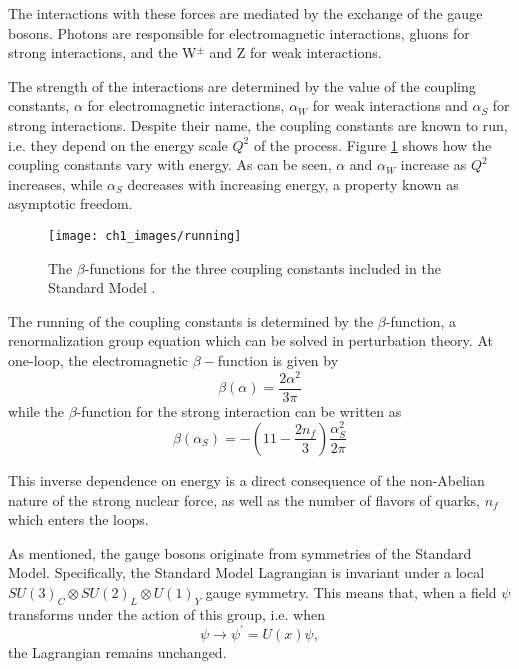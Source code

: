 \documentclass[10pt,a4paper]{book}
\begin{document}
The interactions with these forces are mediated by the exchange of the gauge bosons. Photons are responsible for electromagnetic interactions, gluons for strong interactions, and the W$^\pm$ and Z for weak interactions. 

The strength of the interactions are determined by the value of the coupling constants, $\alpha$ for electromagnetic interactions, $\alpha_W$ for weak interactions and $\alpha_S$ for strong interactions. Despite their name, the coupling constants are known to run, i.e. they depend on the energy scale $Q^2$ of the process. Figure \ref{running coupling constants} shows how the coupling constants vary with energy. As can be seen, $\alpha$ and $\alpha_W$ increase as $Q^2$ increases, while $\alpha_S$ decreases with increasing energy, a property known as asymptotic freedom. 

\begin{figure}
\centering
\texttt{[image: ch1\_images/running]}
\caption{The $\beta$-functions for the three coupling constants included in the Standard Model \cite{wiki:xxx}.}
\label{running coupling constants}
\end{figure}

The running of the coupling constants is determined by the $\beta$-function, a renormalization group equation which can be solved in perturbation theory. At one-loop, the electromagnetic $\beta-$function is given by
\begin{equation}
\beta(\alpha) = \frac{2\alpha^2}{3\pi}
\end{equation}
while the $\beta$-function for the strong interaction can be written as
\begin{equation}
\beta(\alpha_S) = -\left(11 - \frac{2n_f}{3} \right)\frac{\alpha_S^2}{2\pi}
\end{equation}

This inverse dependence on energy is a direct consequence of the non-Abelian nature of the strong nuclear force, as well as the number of flavors of quarks, $n_f$ which enters the loops.  

As mentioned, the gauge bosons originate from symmetries of the Standard Model. Specifically, the Standard Model Lagrangian is invariant under a local $SU(3)_C \otimes SU(2)_L \otimes U(1)_Y$ gauge symmetry. This means that, when a field $\psi$ transforms under the action of this group, i.e. when
\begin{equation}
\psi \rightarrow \psi^\prime = U(x)\psi,
\end{equation}
the Lagrangian remains unchanged. 
\end{document}
